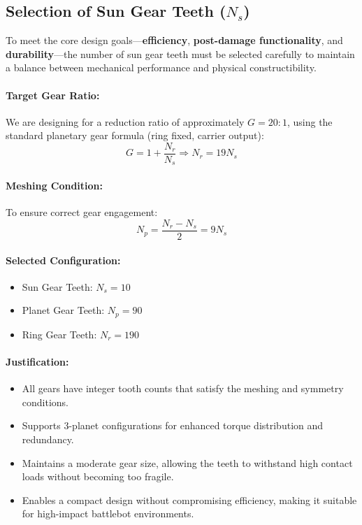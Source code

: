 \documentclass[a4paper,12pt]{article}
\begin{document}
\subsection*{Selection of Sun Gear Teeth (\( N_s \))}

To meet the core design goals—\textbf{efficiency}, \textbf{post-damage functionality}, and \textbf{durability}—the number of sun gear teeth must be selected carefully to maintain a balance between mechanical performance and physical constructibility.

\paragraph{Target Gear Ratio:}
We are designing for a reduction ratio of approximately \( G = 20:1 \), using the standard planetary gear formula (ring fixed, carrier output):
\[
G = 1 + \frac{N_r}{N_s}
\Rightarrow N_r = 19N_s
\]

\paragraph{Meshing Condition:}
To ensure correct gear engagement:
\[
N_p = \frac{N_r - N_s}{2} = 9N_s
\]

\paragraph{Selected Configuration:}
\begin{itemize}
    \item Sun Gear Teeth: \( N_s = 10 \)
    \item Planet Gear Teeth: \( N_p = 90 \)
    \item Ring Gear Teeth: \( N_r = 190 \)
\end{itemize}

\paragraph{Justification:}
\begin{itemize}
    \item All gears have integer tooth counts that satisfy the meshing and symmetry conditions.
    \item Supports 3-planet configurations for enhanced torque distribution and redundancy.
    \item Maintains a moderate gear size, allowing the teeth to withstand high contact loads without becoming too fragile.
    \item Enables a compact design without compromising efficiency, making it suitable for high-impact battlebot environments.
\end{itemize}
\end{document}
